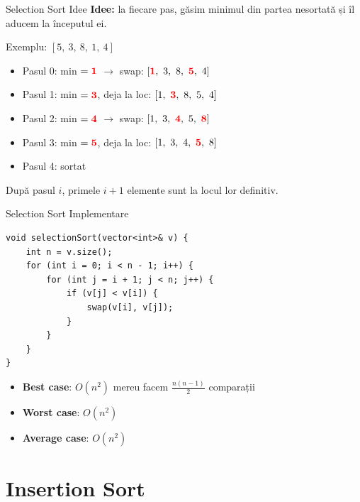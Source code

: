 \documentclass{beamer}
\begin{document}
\begin{frame}{Selection Sort \textemdash{} Idee}
  \textbf{Idee:} la fiecare pas, găsim minimul din partea nesortată și îl aducem la începutul ei.
  \bigskip

  Exemplu: $[5,\ 3,\ 8,\ 1,\ 4]$
  \begin{itemize}
    \item Pasul 0: min $= \textcolor{red}{\mathbf{1}}$ $\rightarrow$ swap: $[\textcolor{red}{\mathbf{1}},\ 3,\ 8,\ \textcolor{red}{\mathbf{5}},\ 4]$
    \item Pasul 1: min $= \textcolor{red}{\mathbf{3}}$, deja la loc: $[1,\ \textcolor{red}{\mathbf{3}},\ 8,\ 5,\ 4]$
    \item Pasul 2: min $= \textcolor{red}{\mathbf{4}}$ $\rightarrow$ swap: $[1,\ 3,\ \textcolor{red}{\mathbf{4}},\ 5,\ \textcolor{red}{\mathbf{8}}]$
    \item Pasul 3: min $= \textcolor{red}{\mathbf{5}}$, deja la loc: $[1,\ 3,\ 4,\ \textcolor{red}{\mathbf{5}},\ 8]$
    \item Pasul 4: sortat \checkmark
  \end{itemize}
  \medskip
  După pasul $i$, primele $i+1$ elemente sunt la locul lor definitiv.
\end{frame}

\begin{frame}[fragile]{Selection Sort \textemdash{} Implementare}
  \begin{lstlisting}
void selectionSort(vector<int>& v) {
    int n = v.size();
    for (int i = 0; i < n - 1; i++) {
        for (int j = i + 1; j < n; j++) {
            if (v[j] < v[i]) {
                swap(v[i], v[j]);
            }
        }
    }
}
  \end{lstlisting}
  \begin{itemize}
    \item \textbf{Best case}: $O(n^2)$ \textemdash{} mereu facem $\tfrac{n(n-1)}{2}$ comparații
    \item \textbf{Worst case}: $O(n^2)$
    \item \textbf{Average case}: $O(n^2)$
  \end{itemize}
\end{frame}

\section{Insertion Sort}
\end{document}

